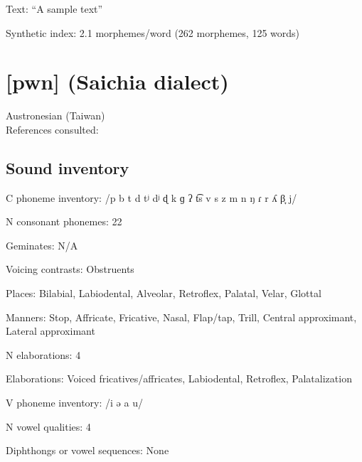 {\begin{appendixdesc}

\item[Text:] “A sample text” \citep[55--58]{Leavitt1996}

\item[Synthetic index:] 2.1 morphemes/word (262 morphemes, 125 words)
\end{appendixdesc}
\section*{[pwn]  (Saichia dialect)}  %
Austronesian (Taiwan)\medskip\\
References consulted: \citet{Chang2006}

\subsection*{Sound inventory}
\begin{appendixdesc}

\item[C phoneme inventory:] /p b t d tʲ dʲ ɖ k ɡ ʔ t͡s v s z m n ŋ ɾ r ʎ β̞ j/

\item[N consonant phonemes:] 22

\item[Geminates:] N/A

\item[Voicing contrasts:] Obstruents

\item[Places:] Bilabial, Labiodental, Alveolar, Retroflex, Palatal, Velar, Glottal

\item[Manners:] Stop, Affricate, Fricative, Nasal, Flap/tap, Trill, Central approximant, Lateral approximant

\item[N elaborations:] 4

\item[Elaborations:] Voiced fricatives/affricates, Labiodental, Retroflex, Palatalization

\item[V phoneme inventory:] /i ə a u/

\item[N vowel qualities:] 4

\item[Diphthongs or vowel sequences:] None


\end{appendixdesc}}
